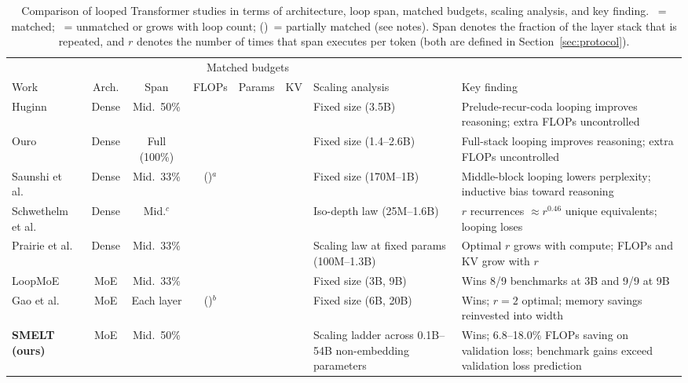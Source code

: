 \documentclass[]{bytedance_seed}
\newcommand{\xmark}{\ding{55}}
\newcommand{\fittotextwidth}[1]{#1}
\newcommand{\archname}{SMELT}
\theoremstyle{definition}
\theoremstyle{remark}
\begin{document}
%
\begin{table}[t]
  \centering
  \footnotesize
  \setlength{\tabcolsep}{4pt}
  \renewcommand{\arraystretch}{1.2}
  \caption{Comparison of looped Transformer studies in terms of architecture, loop span, matched budgets, scaling analysis, and key finding.
    \checkmark~= matched; \xmark~= unmatched or grows with loop count; (\checkmark)~= partially matched (see notes).
    Span denotes the fraction of the layer stack that is repeated, and $r$ denotes the number of times that span executes per token (both are defined in Section~\ref{sec:protocol}).}
  \label{tab:related-comparison}
  \fittotextwidth{%
  \begin{tabular}{@{}l c c c c c
    >{\raggedright\arraybackslash}m{3.0cm}
    >{\raggedright\arraybackslash}m{3.6cm}@{}}
  \toprule
   & & & \multicolumn{3}{c}{Matched budgets} & & \\
  \cmidrule(lr){4-6}
  Work & Arch. & Span & FLOPs & Params & KV
    & Scaling analysis
    & Key finding \\
  \midrule
  Huginn~\cite{geiping2025scaling}
    & Dense & Mid.\ 50\%
    & \xmark & \checkmark & \xmark
    & Fixed size (3.5B)
    & Prelude-recur-coda looping improves reasoning; extra FLOPs uncontrolled \\
  Ouro~\cite{zhu2025scaling}
    & Dense & Full (100\%)
    & \xmark & \checkmark & \xmark
    & Fixed size (1.4--2.6B)
    & Full-stack looping improves reasoning; extra FLOPs uncontrolled \\
  Saunshi et al.~\cite{saunshi2025reasoning}
    & Dense & Mid.\ 33\%
    & (\checkmark)$^{a}$ & \xmark & \xmark
    & Fixed size (170M--1B)
    & Middle-block looping lowers perplexity; inductive bias toward reasoning \\
  Schwethelm et al.~\cite{schwethelm2026recurrence}
    & Dense & Mid.$^{c}$
    & \checkmark & \xmark & \checkmark
    & Iso-depth law (25M--1.6B)
    & $r$ recurrences $\approx r^{0.46}$ unique equivalents; looping loses \\
  Prairie et al.~\cite{prairie2026parcae}
    & Dense & Mid.\ 33\%
    & \xmark & \checkmark & \xmark
    & Scaling law at fixed params (100M--1.3B)
    & Optimal $r$ grows with compute; FLOPs and KV grow with $r$ \\
  LoopMoE~\cite{chen2026loopmoe}
    & MoE & Mid.\ 33\%
    & \checkmark & \checkmark & \xmark
    & Fixed size (3B, 9B)
    & Wins 8/9 benchmarks at 3B and 9/9 at 9B \\
  Gao et al.~\cite{gao2026loopie}
    & MoE & Each layer
    & (\checkmark)$^{b}$ & \xmark & \xmark
    & Fixed size (6B, 20B)
    & Wins; $r\!=\!2$ optimal; memory savings reinvested into width \\
  \midrule
  \textbf{\archname{} (ours)}
    & MoE & Mid.\ 50\%
    & \checkmark & \checkmark & \checkmark
    & Scaling ladder across 0.1B--54B non-embedding parameters
    & Wins; 6.8--18.0\% FLOPs saving on validation loss; benchmark gains exceed validation loss prediction \\
  \bottomrule
  \end{tabular}%
  }%
  

\end{table}
\end{document}
